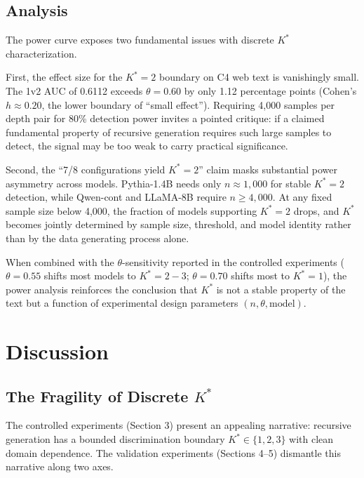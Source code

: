 \documentclass[11pt,a4paper]{article}
\begin{document}
\subsection{Analysis}

The power curve exposes two fundamental issues with discrete $K^*$ characterization.

First, the effect size for the $K^*=2$ boundary on C4 web text is vanishingly small.
The 1v2 AUC of 0.6112 exceeds $\theta = 0.60$ by only 1.12 percentage points (Cohen's $h \approx 0.20$, the lower boundary of ``small effect'').
Requiring 4{,}000 samples per depth pair for 80\% detection power invites a pointed critique: if a claimed fundamental property of recursive generation requires such large samples to detect, the signal may be too weak to carry practical significance.

Second, the ``7/8 configurations yield $K^*=2$'' claim masks substantial power asymmetry across models.
Pythia-1.4B needs only $n \approx 1{,}000$ for stable $K^*=2$ detection, while Qwen-cont and LLaMA-8B require $n \geq 4{,}000$.
At any fixed sample size below 4{,}000, the fraction of models supporting $K^*=2$ drops, and $K^*$ becomes jointly determined by sample size, threshold, and model identity rather than by the data generating process alone.

When combined with the $\theta$-sensitivity reported in the controlled experiments ($\theta = 0.55$ shifts most models to $K^*=2{-}3$; $\theta = 0.70$ shifts most to $K^*=1$), the power analysis reinforces the conclusion that $K^*$ is not a stable property of the text but a function of experimental design parameters $(n, \theta, \text{model})$.


\section{Discussion}

\subsection{The Fragility of Discrete $K^*$}

The controlled experiments (Section 3) present an appealing narrative: recursive generation has a bounded discrimination boundary $K^* \in \{1,2,3\}$ with clean domain dependence.
The validation experiments (Sections 4--5) dismantle this narrative along two axes.
\end{document}
